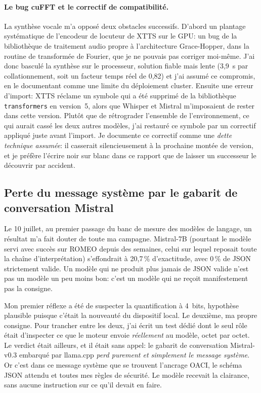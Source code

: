 \documentclass[11pt,a4paper]{article}
\begin{document}
\paragraph{Le bug cuFFT et le correctif de compatibilité.} La synthèse vocale m'a opposé deux obstacles successifs. D'abord un plantage systématique de l'encodeur de locuteur de XTTS sur le GPU: un bug de la bibliothèque de traitement audio propre à l'architecture Grace-Hopper, dans la routine de transformée de Fourier, que je ne pouvais pas corriger moi-même. J'ai donc basculé la synthèse sur le processeur, solution fiable mais lente (3,9~s par collationnement, soit un facteur temps réel de 0,82) et j'ai assumé ce compromis, en le documentant comme une limite du déploiement cluster. Ensuite une erreur d'import: XTTS réclame un symbole qui a été supprimé de la bibliothèque \texttt{transformers} en version~5, alors que Whisper et Mistral m'imposaient de rester dans cette version. Plutôt que de rétrograder l'ensemble de l'environnement, ce qui aurait cassé les deux autres modèles, j'ai restauré ce symbole par un correctif appliqué juste avant l'import. Je documente ce correctif comme une \emph{dette technique assumée}: il casserait silencieusement à la prochaine montée de version, et je préfère l'écrire noir sur blanc dans ce rapport que de laisser un successeur le découvrir par accident. 

\subsection{Perte du message système par le gabarit de conversation Mistral}
\label{sec:merge-system}

Le 10 juillet, au premier passage du banc de mesure des modèles de langage, un résultat m'a fait douter de toute ma campagne. Mistral-7B (pourtant le modèle servi avec succès sur ROMEO depuis des semaines, celui sur lequel reposait toute la chaîne d'interprétation) s'effondrait à 20,7\,\% d'exactitude, avec 0\,\% de JSON strictement valide. Un modèle qui ne produit plus jamais de JSON valide n'est pas un modèle un peu moins bon: c'est un modèle qui ne reçoit manifestement pas la consigne. 

Mon premier réflexe a été de suspecter la quantification à 4~bits, hypothèse plausible puisque c'était la nouveauté du dispositif local. Le deuxième, ma propre consigne. Pour trancher entre les deux, j'ai écrit un test dédié dont le seul rôle était d'inspecter ce que le moteur envoie \emph{réellement} au modèle, octet par octet. Le verdict était ailleurs, et il était sans appel: le gabarit de conversation Mistral-v0.3 embarqué par llama.cpp \emph{perd purement et simplement le message système}. Or c'est dans ce message système que se trouvent l'ancrage OACI, le schéma JSON attendu et toutes mes règles de sécurité. Le modèle recevait la clairance, sans aucune instruction sur ce qu'il devait en faire.
\end{document}
